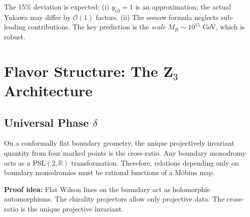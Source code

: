\begin{remark}
The 15\% deviation is expected: (i) $y_{\nu 3} = 1$ is an approximation; the 
actual Yukawa may differ by $\mathcal{O}(1)$ factors. (ii) The seesaw formula 
neglects sub-leading contributions. The key prediction is the \emph{scale} 
$M_R \sim 10^{15}$ GeV, which is robust.
\end{remark}

\section{Flavor Structure: The Z$_3$ Architecture}

\subsection{Universal Phase $\delta$}

\begin{tcolorbox}[colback=purple!3, colframe=purple!50!black, 
    title={\textbf{Lemma (Cross-Ratio from Boundary Monodromy)}}, fonttitle=\bfseries\small]
On a conformally flat boundary geometry, the unique projectively invariant quantity 
from four marked points is the cross-ratio. Any boundary monodromy acts as a 
PSL$(2,\mathbb{R})$ transformation. Therefore, relations depending only on boundary 
monodromies must be rational functions of a M\"obius map.

\textbf{Proof idea:} Flat Wilson lines on the boundary act as holomorphic automorphisms. 
The chirality projectors allow only projective data. The cross-ratio is the unique 
projective invariant.
\end{tcolorbox}

